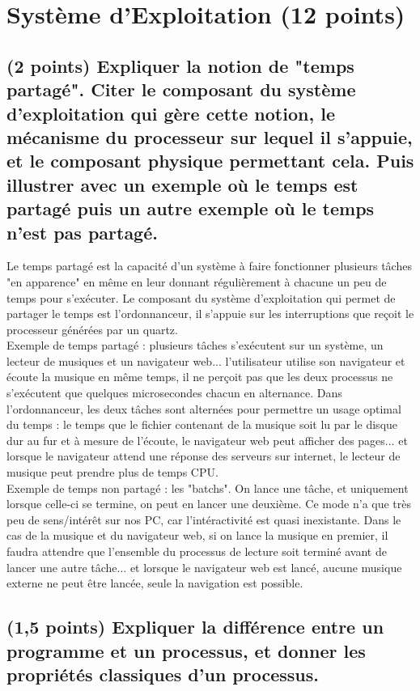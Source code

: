 \documentclass[11pt,a4paper]{article}
\begin{document}

\section{Système d'Exploitation (12 points)} %

\subsection{(2 points) Expliquer la notion de "temps partagé". Citer le composant du système d'exploitation qui gère cette notion, le mécanisme du processeur sur lequel il s'appuie, et le composant physique permettant cela. Puis illustrer avec un exemple où le temps est partagé puis un autre exemple où le temps n'est pas partagé.}

\bigskip
Le temps partagé est la capacité d'un système à faire fonctionner plusieurs tâches "en apparence" en même en leur donnant régulièrement à chacune un peu de temps pour s'exécuter.
Le composant du système d'exploitation qui permet de partager le temps est l'ordonnanceur, il s'appuie sur les interruptions que reçoit le processeur générées par un quartz.\\
Exemple de temps partagé : plusieurs tâches s'exécutent sur un système, un lecteur de musiques et un navigateur web... l'utilisateur utilise son navigateur et écoute la musique en même temps, il ne perçoit pas que les deux processus ne s'exécutent que quelques microsecondes chacun en alternance.
Dans l'ordonnanceur, les deux tâches sont alternées pour permettre un usage optimal du temps : le temps que le fichier contenant de la musique soit lu par le disque dur au fur et à mesure de l'écoute, le navigateur web peut afficher des pages... et lorsque le navigateur attend une réponse des serveurs sur internet, le lecteur de musique peut prendre plus de temps CPU.\\
Exemple de temps non partagé : les "batchs".
On lance une tâche, et uniquement lorsque celle-ci se termine, on peut en lancer une deuxième.
Ce mode n'a que très peu de sens/intérêt sur nos PC, car l'intéractivité est quasi inexistante.
Dans le cas de la musique et du navigateur web, si on lance la musique en premier, il faudra attendre que l'ensemble du processus de lecture soit terminé avant de lancer une autre tâche... et lorsque le navigateur web est lancé, aucune musique externe ne peut être lancée, seule la navigation est possible.
\bigskip

\subsection{(1,5 points) Expliquer la différence entre un programme et un processus, et donner les propriétés classiques d'un processus.}
\end{document}
